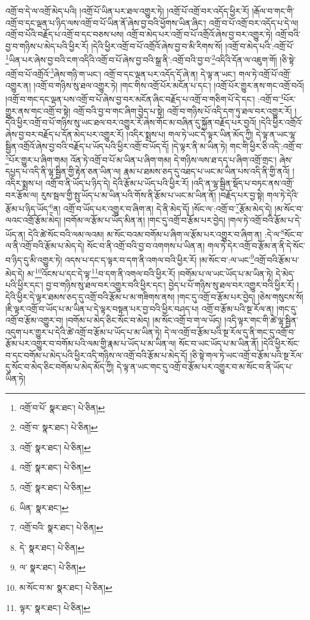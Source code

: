 འགྲོ་བ་དེ་ལ་འགྲོ་མེད་པའི། །འགྲོ་པོ་ཡིན་པར་ཐལ་འགྱུར་ཏེ། །འགྲོ་པོ་འགྲོ་བར་འདོད་ཕྱིར་རོ། །རྒོལ་བ་གང་གི་འགྲོ་བ་དང་ལྡན་པ་ཉིད་ལས་འགྲོ་བ་པོ་ཡིན་ནོ་ཞེས་བྱ་བའི་ཕྱོགས་ཡིན་ཞིང་། འགྲོ་བ་པོ་འགྲོ་བར་འདོད་པ་དེ་ལ། འགྲོ་བ་པོའི་བརྗོད་པ་འགྲོ་བ་དང་བཅས་པས། འགྲོ་བ་མེད་པར་འགྲོ་བ་པོ་འགྲོའོ་ཞེས་བྱ་བར་འགྱུར་ཏེ། འགྲོ་བའི་བྱ་བ་གཉིས་པ་མེད་པའི་ཕྱིར་རོ། །དེའི་ཕྱིར་འགྲོ་བ་པོ་འགྲོའོ་ཞེས་བྱ་བ་མི་རིགས་སོ། །འགྲོ་བ་མེད་པའི་:འགྲོ་པོ་\footnote{འགྲོ་བ་པོ་  སྣར་ཐང་།  པེ་ཅིན། }ཡིན་པར་ཞེས་བྱ་བའི་ངག་འདིའི་འགྲོ་བ་པོ་ཞེས་བྱ་བའི་སྒྲ་ནི་:འགྲོ་བའི་བྱ་བ་\footnote{འགྲོ་བ་  སྣར་ཐང་།  པེ་ཅིན། }འདིའི་དོན་ལ་འཇུག་གོ། །ཅི་སྟེ་འགྲོ་བ་པོ་འགྲོའོ་\footnote{འགྲོ་  སྣར་ཐང་།  པེ་ཅིན། }ཞེས་གཉི་ག་ཡང་། འགྲོ་བ་དང་ལྡན་པར་འདོད་དོ་ཞེ་ན། དེ་ལྟ་ན་ཡང་། གལ་ཏེ་འགྲོ་པོ་འགྲོ་འགྱུར་ན། །འགྲོ་བ་གཉིས་སུ་ཐལ་འགྱུར་ཏེ། །གང་གིས་འགྲོ་པོར་མངོན་པ་དང་། །འགྲོ་པོར་གྱུར་ནས་གང་འགྲོ་བའོ། །འགྲོ་བ་གང་དང་ལྡན་པས་འགྲོ་བ་པོ་ཞེས་བྱ་བར་མངོན་ཞིང་བརྗོད་པ་འགྲོ་བ་གཅིག་པོ་དེ་དང་། :འགྲོ་བ་\footnote{འགྲོ་  སྣར་ཐང་།  པེ་ཅིན། }པོར་གྱུར་ནས་གང་འགྲོ་བ་སྟེ། འགྲོ་བའི་བྱ་བ་གང་ཞིག་བྱེད་པ་སྟེ། འགྲོ་བ་གཉིས་པོ་འདི་དག་ཏུ་ཐལ་བར་འགྱུར་རོ། །དེའི་ཕྱིར་འགྲོ་བ་པོ་གཉིས་སུ་ཡང་ཐལ་བར་འགྱུར་རོ་ཞེས་གོང་མ་བཞིན་དུ་སྐྱོན་བརྗོད་པར་བྱའོ། །དེའི་ཕྱིར་འགྲོའོ་ཞེས་བྱ་བར་བརྗོད་པ་དོན་མེད་པར་འགྱུར་རོ། །འདིར་སྨྲས་པ། གལ་ཏེ་ཡང་དེ་ལྟར་ཡིན་མོད་ཀྱི། དེ་ལྟ་ན་ཡང་ལྷ་སྦྱིན་འགྲོའོ་ཞེས་བྱ་བའི་བརྗོད་པ་ཡོད་པའི་ཕྱིར་འགྲོ་བ་ཡོད་དོ། །དེ་ལྟར་ནི་མ་ཡིན་ཏེ། གང་གི་ཕྱིར་ཅི་འདི་:འགྲོ་བ་\footnote{འགྲོ་  སྣར་ཐང་།  པེ་ཅིན། }པོར་གྱུར་པ་ཞིག་གམ། འོན་ཏེ་འགྲོ་བ་པོ་མ་ཡིན་པ་ཞིག་གམ། དེ་གཉིས་ལས་ཐ་དད་པ་ཞིག་འགྲོ་གྲང་། ཞེས་དཔྱད་པ་འདི་ནི་ལྷ་སྦྱིན་གྱི་རྟེན་ཅན་ཡིན་ལ། རྣམ་པ་ཐམས་ཅད་དུ་འཐད་པ་ཡང་མ་ཡིན་པས་འདི་ནི་གྱི་ནའོ། །འདིར་སྨྲས་པ། འགྲོ་བ་ནི་ཡོད་པ་ཉིད་དེ། དེའི་རྩོམ་པ་ཡོད་པའི་ཕྱིར་རོ། །འདི་ན་ལྷ་སྦྱིན་སྡོད་པ་བཏང་ནས་འགྲོ་བར་རྩོམ་ལ། རུས་སྦལ་གྱི་སྤུ་ཡོད་པ་མ་ཡིན་པའི་གོས་ནི་རྩོམ་པ་ཡང་མ་ཡིན་ནོ། །བརྗོད་པར་བྱ་སྟེ། གལ་ཏེ་དེའི་རྩོམ་པ་ཉིད་ཡོད་\footnote{ཡིན་  སྣར་ཐང་། }ན། འགྲོ་བ་ཡོད་པར་འགྱུར་བ་ཞིག་ན། དེ་ནི་མེད་དོ། །སོང་ལ་:འགྲོ་བ་\footnote{འགྲོ་བའི་  སྣར་ཐང་།  པེ་ཅིན། }རྩོམ་མེད་དེ། །མ་སོང་བ་ལའང་འགྲོ་རྩོམ་མེད། །བགོམ་ལ་རྩོམ་པ་ཡོད་མིན་ན། །གང་དུ་འགྲོ་བ་རྩོམ་པར་བྱེད། །གལ་ཏེ་འགྲོ་བའི་རྩོམ་པ་དེ་ཡོད་ན། དེའི་ཚེ་སོང་བའི་ལམ་ལའམ། མ་སོང་བའམ་བགོམ་པ་ཞིག་ལ་རྩོམ་པར་འགྱུར་བ་ཞིག་ན། :དེ་ལ་\footnote{དེ་  སྣར་ཐང་།  པེ་ཅིན། }སོང་བ་ལ་ནི་འགྲོ་བའི་རྩོམ་པ་མེད་དེ། སོང་བ་ནི་འགྲོ་བའི་བྱ་བ་འགགས་པ་ཡིན་ན། གལ་ཏེ་དེར་འགྲོ་བ་རྩོམ་ན་ནི་དེ་སོང་བ་ཉིད་དུ་མི་འགྱུར་ཏེ། འདས་པ་དང་ད་ལྟར་བ་དག་ནི་འགལ་བའི་ཕྱིར་རོ། །མ་སོང་བ་:ལ་ཡང་\footnote{ལ་  སྣར་ཐང་།  པེ་ཅིན། }འགྲོ་བའི་རྩོམ་པ་མེད་དེ། མ་\footnote{མ་སོང་བ་མ་  སྣར་ཐང་།  པེ་ཅིན། }འོངས་པ་དང་དེ་ལྟ་\footnote{ལྟར་  སྣར་ཐང་།  པེ་ཅིན། }བ་དག་ནི་འགལ་བའི་ཕྱིར་རོ། །བགོམ་པ་ལ་ཡང་ཡོད་པ་མ་ཡིན་ཏེ། དེ་མེད་པའི་ཕྱིར་དང་། བྱ་བ་གཉིས་སུ་ཐལ་བར་འགྱུར་བའི་ཕྱིར་དང་། བྱེད་པ་པོ་གཉིས་སུ་ཐལ་བར་འགྱུར་བའི་ཕྱིར་རོ། །དེའི་ཕྱིར་དེ་ལྟར་ཐམས་ཅད་དུ་འགྲོ་བའི་རྩོམ་པ་མ་གཟིགས་ནས། །གང་དུ་འགྲོ་བ་རྩོམ་པར་བྱེད། །ཅེས་གསུངས་སོ། །ཇི་ལྟར་འགྲོ་བ་ཡོད་པ་མ་ཡིན་པ་དེ་ལྟར་བསྟན་པར་བྱ་བའི་ཕྱིར་བཤད་པ། འགྲོ་བ་རྩོམ་པའི་སྔ་རོལ་ན། །གང་དུ་འགྲོ་བ་རྩོམ་འགྱུར་བ། །བགོམ་པ་མེད་ཅིང་སོང་བ་མེད། །མ་སོང་འགྲོ་བ་ག་ལ་ཡོད། །འདི་ལྟར་གང་གི་ཚེ་ལྷ་སྦྱིན་འདུག་པར་གྱུར་པ་དེའི་ཚེ་འགྲོ་བ་རྩོམ་པ་ཡོད་པ་མ་ཡིན་ཏེ། དེ་ལ་འགྲོ་བ་རྩོམ་པའི་སྔ་རོལ་དུ་ནི་གང་དུ་འགྲོ་བ་རྩོམ་པར་འགྱུར་བ་བགོམ་པའི་ལམ་གྱི་རྣམ་པ་ཡོད་པ་མ་ཡིན་ལ། སོང་བ་ཡང་ཡོད་པ་མ་ཡིན་ནོ། །དེའི་ཕྱིར་སོང་བ་དང་བགོམ་པ་མེད་པའི་ཕྱིར་འདི་གཉིས་ལ་འགྲོ་བའི་རྩོམ་པ་མེད་དོ། །ཅི་སྟེ་གལ་ཏེ་ཡང་འགྲོ་བ་རྩོམ་པའི་སྔ་རོལ་དུ་སོང་བ་མེད་ཅིང་བགོམ་པ་མེད་མོད་ཀྱི། དེ་ལྟ་ན་ཡང་གང་དུ་འགྲོ་བ་རྩོམ་པར་འགྱུར་བ་མ་སོང་བ་ནི་ཡོད་པ་ཡིན་ཏེ། 